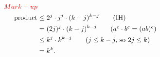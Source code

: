 \documentclass[12pt]{exam}
\begin{document}
\begin{solution}
	\begin{align*}
		\color{red}{Mark-up}                                                     \\
		\text{product} & \leq 2^j\cdot j^j\cdot (k-j)^{k-j} \tag{IH}             \\
		               & =(2j)^j \cdot (k-j)^{k-j} \tag{$a^c\cdot b^c=(ab)^c$}   \\
		               & \leq k^j \cdot k^{k-j} \tag{$j\leq k-j,$ so $2j\leq k$} \\
		               & =k^k.
	\end{align*}
\end{solution}
\end{document}
